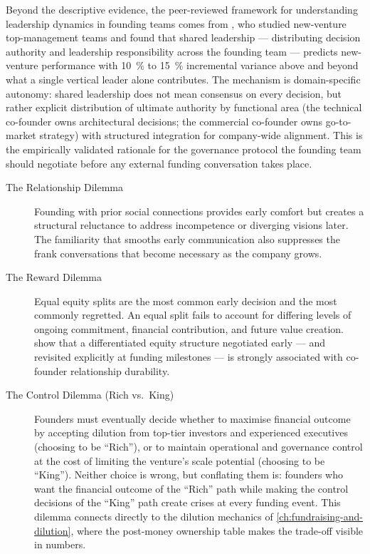Beyond the descriptive evidence, the peer-reviewed framework for understanding leadership
dynamics in founding teams comes from \textcite{ensley2006shared}, who studied new-venture
top-management teams and found that shared leadership --- distributing decision authority and
leadership responsibility across the founding team --- predicts new-venture performance with
\qty{10}{\percent} to \qty{15}{\percent} incremental variance above and beyond what a single vertical leader
alone contributes. The mechanism is domain-specific autonomy: shared leadership does not mean
consensus on every decision, but rather explicit distribution of ultimate authority by functional
area (the technical co-founder owns architectural decisions; the commercial co-founder owns
go-to-market strategy) with structured integration for company-wide alignment. This is the
empirically validated rationale for the governance protocol the founding team should negotiate
before any external funding conversation takes place.

\begin{description}
  \item[The Relationship Dilemma] Founding with prior social connections provides early comfort
    but creates a structural reluctance to address incompetence or diverging visions later.
    The familiarity that smooths early communication also suppresses the frank conversations
    that become necessary as the company grows.
  \item[The Reward Dilemma] Equal equity splits are the most common early decision and the
    most commonly regretted. An equal split fails to account for differing levels of ongoing
    commitment, financial contribution, and future value creation. \textcite{wasserman2012founders}
    show that a differentiated equity structure negotiated early --- and revisited explicitly at
    funding milestones --- is strongly associated with co-founder relationship durability.
  \item[The Control Dilemma (Rich vs.\ King)] Founders must eventually decide whether to
    maximise financial outcome by accepting dilution from top-tier investors and experienced
    executives (choosing to be ``Rich''), or to maintain operational and governance control at
    the cost of limiting the venture's scale potential (choosing to be ``King''). Neither choice
    is wrong, but conflating them is: founders who want the financial outcome of the ``Rich''
    path while making the control decisions of the ``King'' path create crises at every funding
    event. This dilemma connects directly to the dilution mechanics of
    \cref{ch:fundraising-and-dilution}, where the post-money ownership table makes the
    trade-off visible in numbers.
\end{description}

